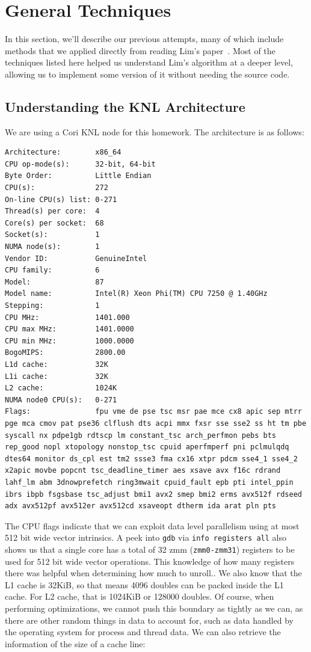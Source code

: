 \documentclass{article}
\begin{document}
\section{General Techniques}
In this section, we'll describe our previous attempts, many of which include methods that we applied directly from reading Lim's paper~\cite{10.1007/s10586-018-2810-y}. Most of the techniques listed here helped us understand Lim's algorithm at a deeper level, allowing us to implement some version of it without needing the source code.

\subsection{Understanding the KNL Architecture}
We are using a Cori KNL node for this homework. The architecture is as follows:
\begin{lstlisting}
Architecture:        x86_64
CPU op-mode(s):      32-bit, 64-bit
Byte Order:          Little Endian
CPU(s):              272
On-line CPU(s) list: 0-271
Thread(s) per core:  4
Core(s) per socket:  68
Socket(s):           1
NUMA node(s):        1
Vendor ID:           GenuineIntel
CPU family:          6
Model:               87
Model name:          Intel(R) Xeon Phi(TM) CPU 7250 @ 1.40GHz
Stepping:            1
CPU MHz:             1401.000
CPU max MHz:         1401.0000
CPU min MHz:         1000.0000
BogoMIPS:            2800.00
L1d cache:           32K
L1i cache:           32K
L2 cache:            1024K
NUMA node0 CPU(s):   0-271
Flags:               fpu vme de pse tsc msr pae mce cx8 apic sep mtrr pge mca cmov pat pse36 clflush dts acpi mmx fxsr sse sse2 ss ht tm pbe syscall nx pdpe1gb rdtscp lm constant_tsc arch_perfmon pebs bts rep_good nopl xtopology nonstop_tsc cpuid aperfmperf pni pclmulqdq dtes64 monitor ds_cpl est tm2 ssse3 fma cx16 xtpr pdcm sse4_1 sse4_2 x2apic movbe popcnt tsc_deadline_timer aes xsave avx f16c rdrand lahf_lm abm 3dnowprefetch ring3mwait cpuid_fault epb pti intel_ppin ibrs ibpb fsgsbase tsc_adjust bmi1 avx2 smep bmi2 erms avx512f rdseed adx avx512pf avx512er avx512cd xsaveopt dtherm ida arat pln pts
\end{lstlisting}

The CPU flags indicate that we can exploit data level parallelism using at most 512 bit wide vector intrinsics. A peek into \verb|gdb| via \verb|info registers all| also shows us that a single core has a total of 32 zmm (\verb|zmm0-zmm31|) registers to be used for 512 bit wide vector operations. This knowledge of how many registers there was helpful when determining how much to unroll.. We also know that the L1 cache is 32KiB, so that means 4096 doubles can be packed inside the L1 cache. For L2 cache, that is 1024KiB or 128000 doubles. Of course, when performing optimizations, we cannot push this boundary as tightly as we can, as there are other random things in data to account for, such as data handled by the operating system for process and thread data. We can also retrieve the information of the size of a cache line:
\end{document}
